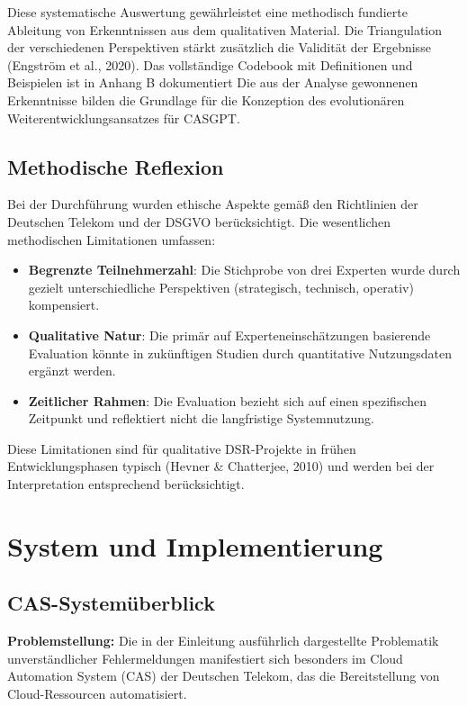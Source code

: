 \documentclass[
  a4paper,
  12pt,
  oneside,
  open=any,
  BCOR=12mm,
  DIV=14,
  parskip=half*,
  headsepline,
  footsepline,
  pointlessnumbers,
  liststotoc,
  numbers=noenddot,
  listof=totoc]{scrartcl}
\providecommand{\tightlist}{%
  \setlength{\itemsep}{0pt}\setlength{\parskip}{0pt}}\usepackage{longtable,booktabs,array}
\begin{document}
Diese systematische Auswertung gewährleistet eine methodisch fundierte
Ableitung von Erkenntnissen aus dem qualitativen Material. Die
Triangulation der verschiedenen Perspektiven stärkt zusätzlich die
Validität der Ergebnisse (Engström et al., 2020). Das vollständige
Codebook mit Definitionen und Beispielen ist in Anhang B dokumentiert
Die aus der Analyse gewonnenen Erkenntnisse bilden die Grundlage für die
Konzeption des evolutionären Weiterentwicklungsansatzes für CASGPT.

\subsection{Methodische Reflexion}\label{methodische-reflexion}

Bei der Durchführung wurden ethische Aspekte gemäß den Richtlinien der
Deutschen Telekom und der DSGVO berücksichtigt. Die wesentlichen
methodischen Limitationen umfassen:

\begin{itemize}
\tightlist
\item
  \textbf{Begrenzte Teilnehmerzahl}: Die Stichprobe von drei Experten
  wurde durch gezielt unterschiedliche Perspektiven (strategisch,
  technisch, operativ) kompensiert.
\item
  \textbf{Qualitative Natur}: Die primär auf Experteneinschätzungen
  basierende Evaluation könnte in zukünftigen Studien durch quantitative
  Nutzungsdaten ergänzt werden.
\item
  \textbf{Zeitlicher Rahmen}: Die Evaluation bezieht sich auf einen
  spezifischen Zeitpunkt und reflektiert nicht die langfristige
  Systemnutzung.
\end{itemize}

Diese Limitationen sind für qualitative DSR-Projekte in frühen
Entwicklungsphasen typisch (Hevner \& Chatterjee, 2010) und werden bei
der Interpretation entsprechend berücksichtigt.

\section{System und Implementierung}\label{system-und-implementierung}

\subsection{CAS-Systemüberblick}\label{cas-systemuxfcberblick}

\textbf{Problemstellung:} Die in der Einleitung ausführlich dargestellte
Problematik unverständlicher Fehlermeldungen manifestiert sich besonders
im Cloud Automation System (CAS) der Deutschen Telekom, das die
Bereitstellung von Cloud-Ressourcen automatisiert.
\end{document}
